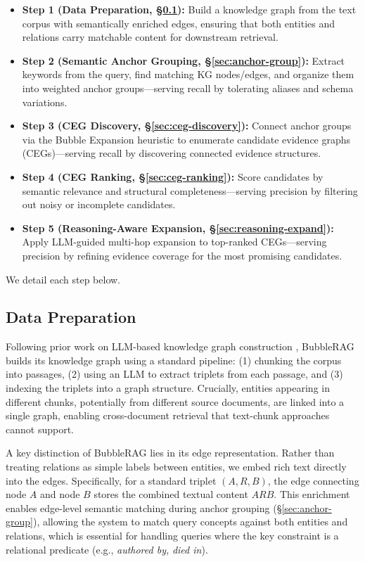 %
\begin{itemize}[leftmargin=*, itemsep=0.3em, topsep=0.3em]
    \item \textbf{Step 1 (Data Preparation, \S\ref{sec:data-prep}):} Build a knowledge graph from the text corpus with semantically enriched edges, ensuring that both entities and relations carry matchable content for downstream retrieval.
    \item \textbf{Step 2 (Semantic Anchor Grouping, \S\ref{sec:anchor-group}):} Extract keywords from the query, find matching KG nodes/edges, and organize them into weighted anchor groups---serving recall by tolerating aliases and schema variations.
    \item \textbf{Step 3 (CEG Discovery, \S\ref{sec:ceg-discovery}):} Connect anchor groups via the Bubble Expansion heuristic to enumerate candidate evidence graphs (CEGs)---serving recall by discovering connected evidence structures.
    \item \textbf{Step 4 (CEG Ranking, \S\ref{sec:ceg-ranking}):} Score candidates by semantic relevance and structural completeness---serving precision by filtering out noisy or incomplete candidates.
    \item \textbf{Step 5 (Reasoning-Aware Expansion, \S\ref{sec:reasoning-expand}):} Apply LLM-guided multi-hop expansion to top-ranked CEGs---serving precision by refining evidence coverage for the most promising candidates.
\end{itemize}


We detail each step below.


\subsection{Data Preparation}\label{sec:data-prep}

Following prior work on LLM-based knowledge graph construction \cite{2025-lightrag,2024-hipporag}, BubbleRAG builds its knowledge graph using a standard pipeline: (1) chunking the corpus into passages, (2) using an LLM to extract triplets from each passage, and (3) indexing the triplets into a graph structure. Crucially, entities appearing in different chunks, potentially from different source documents, are linked into a single graph, enabling cross-document retrieval that text-chunk approaches cannot support.

A key distinction of BubbleRAG lies in its edge representation. Rather than treating relations as simple labels between entities, we embed rich text directly into the edges. Specifically, for a standard triplet $(A, R, B)$, the edge connecting node $A$ and node $B$ stores the combined textual content $ARB$. This enrichment enables edge-level semantic matching during anchor grouping (\S\ref{sec:anchor-group}), allowing the system to match query concepts against both entities and relations, which is essential for handling queries where the key constraint is a relational predicate (e.g., \textit{authored by,} \textit{died in}).


